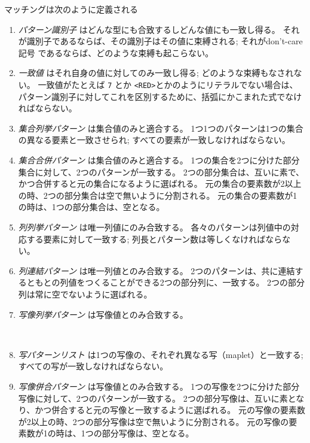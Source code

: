 \documentclass[\pformat,12pt]{jarticle}
\begin{document}
\begin{description}
 マッチングは次のように定義される
  \begin{enumerate}
  \item  {\it パターン識別子} はどんな型にも合致するしどんな値にも一致し得る。
それが識別子であるならば、その識別子はその値に束縛される;
それがdon't-care記号 \Lit{-}であるならば、どのような束縛も起こらない。

  \item {\it 一致値} はそれ自身の値に対してのみ一致し得る; どのような束縛もなされない。
一致値がたとえば {\tt 7} とか {\tt <RED>}とかのようにリテラルでない場合は、パターン識別子に対してこれを区別するために、括弧にかこまれた式でなければならない。

  \item  {\it 集合列挙パターン} は集合値のみと適合する。
1つ1つのパターンは1つの集合の異なる要素と一致させられ; すべての要素が一致しなければならない。

  \item   {\it 集合合併パターン} は集合値のみと適合する。
1つの集合を2つに分けた部分集合に対して、2つのパターンが一致する。
2つの部分集合は、互いに素で、かつ合併すると元の集合になるように選ばれる。
元の集合の要素数が2以上の時、2つの部分集合は空で無いように分割される。
元の集合の要素数が1の時は、1つの部分集合は、空となる。

  \item  {\it 列列挙パターン} は唯一列値にのみ合致する。
 各々のパターンは列値中の対応する要素に対して一致する; 列長とパターン数は等しくなければならない。

  \item  {\it 列連結パターン} は唯一列値とのみ合致する。
 2つのパターンは、共に連結するともとの列値をつくることができる2つの部分列に、一致する。 
2つの部分列は常に空でないように選ばれる。

  \item  {\it 写像列挙パターン} は写像値とのみ合致する。

　 \item  {\it 写パターンリスト} は1つの写像の、それぞれ異なる写（maplet）と一致する; すべての写が一致しなければならない。

 \item  {\it 写像併合パターン} は写像値とのみ合致する。
 1つの写像を2つに分けた部分写像に対して、2つのパターンが一致する。
2つの部分写像は、互いに素となり、かつ併合すると元の写像と一致するように選ばれる。
元の写像の要素数が2以上の時、2つの部分写像は空で無いように分割される。
元の写像の要素数が1の時は、1つの部分写像は、空となる。


\end{enumerate}
\end{description}
\end{document}
